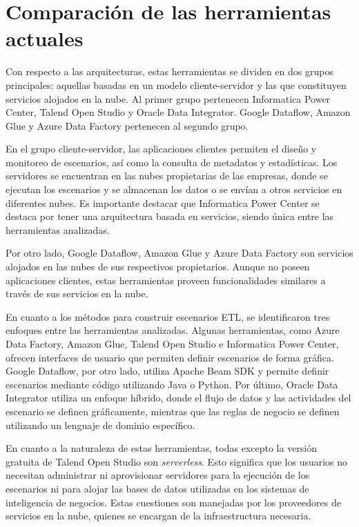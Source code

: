 \section{Comparaci\'on de las herramientas actuales} \label{section:ToolsComparison}

Con respecto a las arquitecturas, estas herramientas se dividen en dos grupos principales: aquellas basadas en un modelo 
cliente-servidor y las que constituyen servicios alojados en la nube. Al primer grupo pertenecen Informatica Power Center, 
Talend Open Studio y Oracle Data Integrator. Google Dataflow, Amazon Glue y Azure Data Factory pertenecen al segundo 
grupo.

En el grupo cliente-servidor, las aplicaciones clientes permiten el diseño y monitoreo de escenarios, así como la 
consulta de metadatos y estadísticas. Los servidores se encuentran en las nubes propietarias de las empresas, donde se 
ejecutan los escenarios y se almacenan los datos o se envían a otros servicios en diferentes nubes. Es importante 
destacar que Informatica Power Center se destaca por tener una arquitectura basada en servicios, siendo única entre las 
herramientas analizadas.

Por otro lado, Google Dataflow, Amazon Glue y Azure Data Factory son servicios alojados en las nubes de sus respectivos 
propietarios. Aunque no poseen aplicaciones clientes, estas herramientas proveen funcionalidades similares a través de sus 
servicios en la nube.

En cuanto a los métodos para construir escenarios ETL, se identificaron tres enfoques entre las herramientas analizadas. 
Algunas herramientas, como Azure Data Factory, Amazon Glue, Talend Open Studio e Informatica Power Center, ofrecen 
interfaces de usuario que permiten definir escenarios de forma gráfica. Google Dataflow, por otro lado, utiliza Apache 
Beam SDK y permite definir escenarios mediante código utilizando Java o Python. Por último, Oracle Data Integrator 
utiliza un enfoque híbrido, donde el flujo de datos y las actividades del escenario se definen gráficamente, mientras 
que las reglas de negocio se definen utilizando un lenguaje de dominio específico.

En cuanto a la naturaleza de estas herramientas, todas excepto la versión gratuita de Talend Open Studio son \emph{serverless}. 
Esto significa que los usuarios no necesitan administrar ni aprovisionar servidores para la ejecución de los escenarios 
ni para alojar las bases de datos utilizadas en los sistemas de inteligencia de negocios. Estas cuestiones son manejadas 
por los proveedores de servicios en la nube, quienes se encargan de la infraestructura necesaria.  